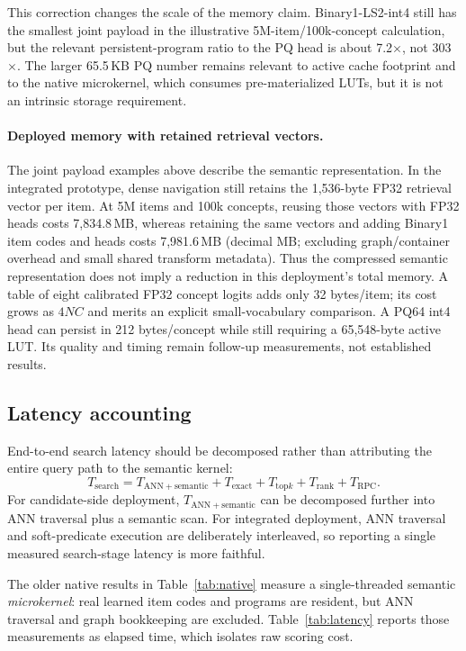 This correction changes the scale of the memory claim. Binary1-LS2-int4 still has the smallest joint payload in the illustrative 5M-item/100k-concept calculation, but the relevant persistent-program ratio to the PQ head is about 7.2$\times$, not 303$\times$. The larger 65.5\,KB PQ number remains relevant to active cache footprint and to the native microkernel, which consumes pre-materialized LUTs, but it is not an intrinsic storage requirement.

\paragraph{Deployed memory with retained retrieval vectors.}
The joint payload examples above describe the semantic representation. In the integrated prototype, dense navigation still retains the 1,536-byte FP32 retrieval vector per item. At 5M items and 100k concepts, reusing those vectors with FP32 heads costs 7,834.8\,MB, whereas retaining the same vectors and adding Binary1 item codes and heads costs 7,981.6\,MB (decimal MB; excluding graph/container overhead and small shared transform metadata). Thus the compressed semantic representation does not imply a reduction in this deployment's total memory. A table of eight calibrated FP32 concept logits adds only 32 bytes/item; its cost grows as $4NC$ and merits an explicit small-vocabulary comparison. A PQ64 int4 head can persist in 212 bytes/concept while still requiring a 65,548-byte active LUT. Its quality and timing remain follow-up measurements, not established results.

\subsection{Latency accounting}
End-to-end search latency should be decomposed rather than attributing the entire query path to the semantic kernel:
\begin{equation}
T_{\mathrm{search}} = T_{\mathrm{ANN+semantic}} + T_{\mathrm{exact}} + T_{\mathrm{top}k}
+ T_{\mathrm{rank}} + T_{\mathrm{RPC}}.
\label{eq:latency_decomp}
\end{equation}
For candidate-side deployment, $T_{\mathrm{ANN+semantic}}$ can be decomposed further into ANN traversal plus a semantic scan. For integrated deployment, ANN traversal and soft-predicate execution are deliberately interleaved, so reporting a single measured search-stage latency is more faithful.

The older native results in Table~\ref{tab:native} measure a single-threaded semantic \emph{microkernel}: real learned item codes and programs are resident, but ANN traversal and graph bookkeeping are excluded. Table~\ref{tab:latency} reports those measurements as elapsed time, which isolates raw scoring cost.

